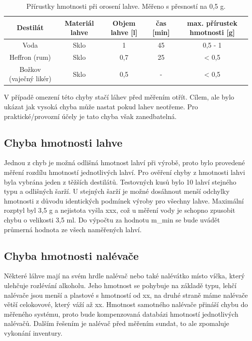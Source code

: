 \begin{table}[H]
    \centering
    \begin{tabular}{|c|c|c|c|c|}
        \hline
         Destilát & Materiál lahve & Objem lahve [l] & čas [min] & max. přírustek hmotnosti [g]\\
         \hline
         Voda & Sklo & 1 & 45 & 0,5 - 1\\
         \hline
         Heffron (rum) & Sklo & 0,7 & 25 & < 0,5\\
         \hline
         Božkov (vaječný likér) & Sklo & 0,5 & - & < 0,5\\
         \hline
    \end{tabular}
    \caption{Přírustky hmotnosti při orosení lahve. Měřeno s přesností na 0,5 g.}
    \label{tab:my_label}
\end{table}


V případě omezení této chyby stačí láhev před měřením otřít. Cílem, ale bylo ukázat jak vysoká chyba může nastat pokud lahev neotřeme. Pro praktické/provozní účely je tato chyba však zanedbatelná.

\subsection{Chyba hmotnosti lahve}
Jednou z chyb je možná odlišná hmotnost lahví při výrobě, proto bylo provedené měření rozdílu hmotností jednotlivých lahví. Pro ověření chyby z hmotnosti lahvi byla vybrána jeden z těžších destilátů. Testovných kusů bylo 10 lahví stejného typu a odlišných šarží. U stejných šarží je možné dosáhnout menší odchylky hmotnosti z důvodu identických podmínek výroby pro všechny lahve. 
Maximální rozptyl byl 3,5 g a nejistota vyšla xxx, což u měření vody je schopno zpusobit chybu o velikosti 3,5 ml. Do výpočtu za hodnotu m\_min se bude uvádět průmerná hodnota ze všech naměřených lahví.

\subsection{Chyba hmotnosti nalévače}
Některé láhve mají na svém hrdle nalévač nebo také nalévátko místo víčka, který ulehčuje rozlévání alkoholu. Jeho hmotnost se pohybuje na základě typu, lehčí nalévače jsou menší a plastové s hmotností od xx, na druhé straně máme nalévače větší celokovové, který váží až xx. Hmotnost samotného nalévače přináší chybu do měřeného systému, proto bude kompenzovaná databázi hmotností jednotlivých nalévačů. Dalším řešením je nalévač před měřením sundat, to ale zpomaluje vykonání inventury.   

